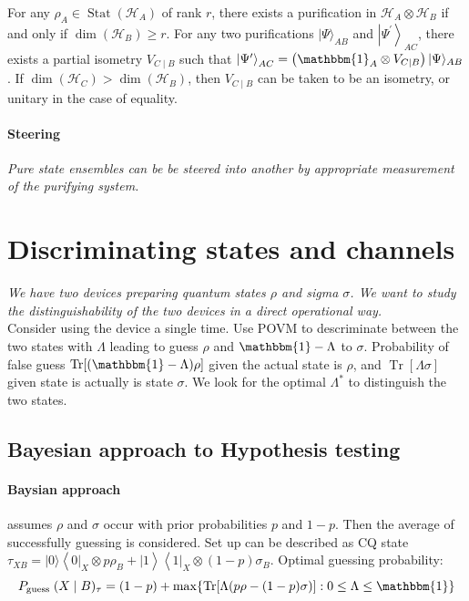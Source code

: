 \begin{proposition}
  For any $\rho_A \in \operatorname{Stat}\left(\mathcal{H}_A\right)$ of rank $r$, there exists a purification in $\mathcal{H}_A \otimes \mathcal{H}_B$ if 
  and only if $\operatorname{dim}\left(\mathcal{H}_B\right) \geq r$. For any two purifications $|\Psi\rangle_{A B}$ and $\left|\Psi^{\prime}\right\rangle_{A C}$, 
  there exists a partial isometry $V_{C \mid B}$ such that $\left|\Psi^{\prime}\right\rangle_{A C}=\left(\mathbbm{1}_A \otimes V_{C \mid B}\right)|\Psi\rangle_{A B}$. 
  If $\operatorname{dim}\left(\mathcal{H}_C\right)>\operatorname{dim}\left(\mathcal{H}_B\right)$, then
  $V_{C \mid B}$ can be taken to be an isometry, or unitary in the case of equality.
\end{proposition}

\paragraph{Steering} \emph{Pure state ensembles can be be steered into another by appropriate measurement
of the purifying system.}

\section{Discriminating states and channels}
\emph{We have two devices preparing quantum states $\rho$ and sigma $\sigma$. We want to study the distinguishability of the two devices in 
a direct operational way.}\\

Consider using the device a single time. Use POVM to descriminate between the two states with $\Lambda$ leading to guess $\rho$ and
 $\mathbbm{1}-\Lambda$ to $\sigma$. Probability of false guess $\operatorname{Tr}[(\mathbbm{1}-\Lambda) \rho]$ given the actual state is $\rho$,
 and $\operatorname{Tr}[\Lambda \sigma]$ given state is actually is state $\sigma$. We look for the optimal $\Lambda^*$ to distinguish the 
 two states.\\

 \subsection{Bayesian approach to Hypothesis testing}

\paragraph{Baysian approach} assumes $\rho$ and $\sigma$ occur with prior probabilities $p$ and $1-p$. Then the average of successfully 
guessing is considered. Set up can be described as CQ state $\tau_{XB} = |0\rangle\left\langle\left. 0\right|_X \otimes p \rho_B+\mid 1\right\rangle\left\langle\left. 1\right|_X \otimes(1-p) \sigma_B\right.$.
Optimal guessing probability: 
$$P_{\text {guess }}(X \mid B)_\tau=(1-p)+\max \{\operatorname{Tr}[\Lambda(p \rho-(1-p) \sigma)]: 0 \leq \Lambda \leq \mathbbm{1}\}$$\\

